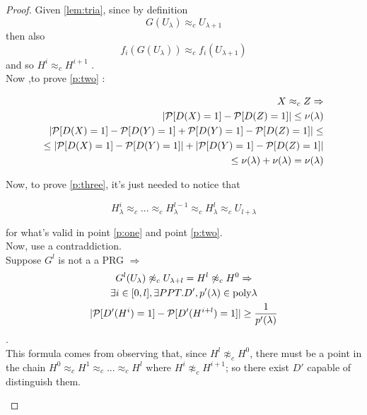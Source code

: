 \begin{proof}
    Given \ref{lem:tria}, since by definition 
    \[
        G(U_{\lambda}) \approx_{c} U_{\lambda + 1}
    \]
    then also
    \[
        f_{i}(G(U_{\lambda })) \approx_{c} f_{i}(U_{\lambda + 1}) 
    \]
    and so $H^{i} \approx_{c} H^{i + 1}$ .\\

    Now ,to prove \ref{p:two} :

\begin{align}
    X \approx_{c} Z \Rightarrow \\
    | \P [ D(X)=1 ] - \P [ D(Z)=1 ]   | \leq \nu(\lambda) \\
    | \P [ D(X)=1 ] - \P [ D(Y)=1 ] + \P [ D(Y)=1 ] -  \P [ D(Z)=1]   | \leq\\
    \leq | \P [ D(X)=1 ] - \P [ D(Y)=1 ]  | + | \P [ D(Y)=1 ] - \P [ D(Z)=1 ]| \\
    \leq \nu(\lambda) + \nu(\lambda) = \nu(\lambda) 
\end{align}

Now, to prove \ref{p:three}, it's just needed to notice that 

\begin{equation} \label{eq:hiequll}
        H_{\lambda}^{i} \approx_{c} ... \approx_{c}  H_{\lambda}^{l-1} \approx_{c} H_{\lambda}^{l} \approx_{c}  U_{l+\lambda}
    \end{equation}
    

for what's valid in point \ref{p:one} and point \ref{p:two}.\\

Now, use a contraddiction.\\
Suppose $G^{l}$ is not a a PRG $\Rightarrow$ \\

\begin{gather*}
    G^{l}(U_{\lambda}) \not\approx_{c} U_{\lambda + l} = H^{l} \not\approx_{c}
    H^{0} \Rightarrow  \\
    \exists i \in [0,l] , \exists PPT.D'  , p'(\lambda) \in \poly{\lambda} \\
    | \P [ D'(H^{i})=1 ] - \P [ D'(H^{i+l})=1 ]   | \geq \frac{1}{p'(\lambda)}
\end{gather*}.\\
This formula comes from observing that, since $H^{l} \not \approx_{c} H^{0}$,
there must be a point in the chain $H^{0} \approx_{c}  H^{1} \approx_{c} ...
\approx_{c} H^{l}$ where $H^{i} \not \approx_{c} H^{i+1}$; so
there exist $D'$ capable of distinguish them.\newpage
\begin{figure}[h!]
   \centering
   \sdinit{}
\end{figure}
\end{proof}
